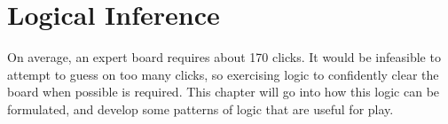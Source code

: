\chapter{Logical Inference}\label{sec:ng}
On average, an expert board requires about 170 clicks. It would be infeasible to attempt to guess on too many clicks, so exercising logic to confidently clear the board when possible is required. This chapter will go into how this logic can be formulated, and develop some patterns of logic that are useful for play.\\







